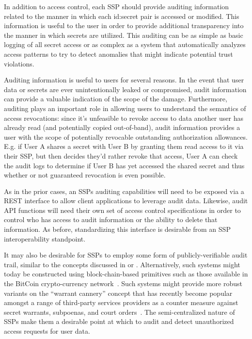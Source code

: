 In addition to access control, each SSP should provide auditing
information related to the manner in which each id:secret pair is
accessed or modified. This information is useful to the user in order
to provide additional transparency into the manner in which secrets
are utilized. This auditing can be as simple as basic logging of all
secret access or as complex as a system that automatically analyzes
access patterns to try to detect anomalies that might indicate
potential trust violations.

Auditing information is useful to users for several reasons. In the
event that user data or secrets are ever unintentionally leaked or
compromised, audit information can provide a valuable indication of
the scope of the damage. Furthermore, auditing plays an important role
in allowing users to understand the semantics of access revocations:
since it's unfeasible to revoke access to data another user has
already read (and potentially copied out-of-band), audit information
provides a user with the scope of potentially revocable outstanding
authorization allowances. E.g. if User A shares a secret with User B
by granting them read access to it via their SSP, but then decides
they'd rather revoke that access, User A can check the audit logs to
determine if User B has yet accessed the shared secret and thus
whether or not guaranteed revocation is even possible.

As in the prior cases, an SSPs auditing capabilities will need to be
exposed via a REST interface to allow client applications to leverage
audit data. Likewise, audit API functions will need their own set of
access control specifications in order to control who has access to
audit information or the ability to delete that information. As
before, standardizing this interface is desirable from an SSP
interoperability standpoint.

It may also be desirable for SSPs to employ some form of
publicly-verifiable audit trail, similar to the concepts discussed in
\cite{blaze1996} or \cite{laurie2013}. Alternatively, such systems
might today be constructed using block-chain-based primitives such as
those available in the BitCoin crypto-currency
network~\cite{Nakamoto2008}. Such systems might provide more robust
variants on the ``warrant cannery'' concept that has recently become
popular amongst a range of third-party services providers as a counter
measure against secret warrants, subpoenas, and court
orders~\cite{eff-canary}. The semi-centralized nature of SSPs make
them a desirable point at which to audit and detect unauthorized
access requests for user data.

